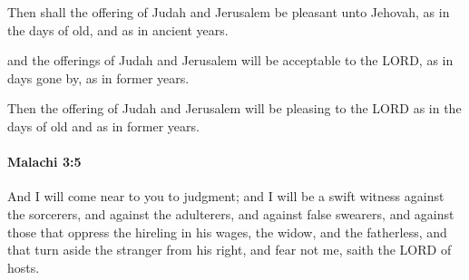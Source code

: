 			\begin{versebox}
					\item[BHS] 
					\item[LXX] 
					\item[ASV] Then shall the offering of Judah and Jerusalem be pleasant unto Jehovah, as in the days of old, and as in ancient years.
					\item[NIV] and the offerings of Judah and Jerusalem will be acceptable to the LORD, as in days gone by, as in former years.
					\item[NRSV] Then the offering of Judah and Jerusalem will be pleasing to the LORD as in the days of old and as in former years.
			\end{versebox}

		\paragraph{Malachi 3:5} %
			\label{MALACHI-3-5}

			And I will come near to you to judgment; and I will be a swift witness against the sorcerers, and against the adulterers, and against false swearers, and against those that oppress the hireling in his wages, the widow, and the fatherless, and that turn aside the stranger from his right, and fear not me, saith the LORD of hosts.

